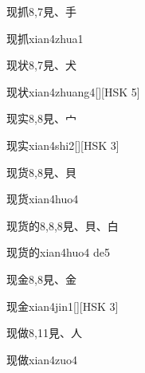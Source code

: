 \begin{Entry}{现抓}{8,7}{⾒、⼿}
  \begin{Phonetics}{现抓}{xian4zhua1}
  \end{Phonetics}
\end{Entry}

\begin{Entry}{现状}{8,7}{⾒、⽝}
  \begin{Phonetics}{现状}{xian4zhuang4}[][HSK 5]
  \end{Phonetics}
\end{Entry}

\begin{Entry}{现实}{8,8}{⾒、⼧}
  \begin{Phonetics}{现实}{xian4shi2}[][HSK 3]
  \end{Phonetics}
\end{Entry}

\begin{Entry}{现货}{8,8}{⾒、⾙}
  \begin{Phonetics}{现货}{xian4huo4}
  \end{Phonetics}
\end{Entry}

\begin{Entry}{现货的}{8,8,8}{⾒、⾙、⽩}
  \begin{Phonetics}{现货的}{xian4huo4 de5}
  \end{Phonetics}
\end{Entry}

\begin{Entry}{现金}{8,8}{⾒、⾦}
  \begin{Phonetics}{现金}{xian4jin1}[][HSK 3]
  \end{Phonetics}
\end{Entry}

\begin{Entry}{现做}{8,11}{⾒、⼈}
  \begin{Phonetics}{现做}{xian4zuo4}
  \end{Phonetics}
\end{Entry}

